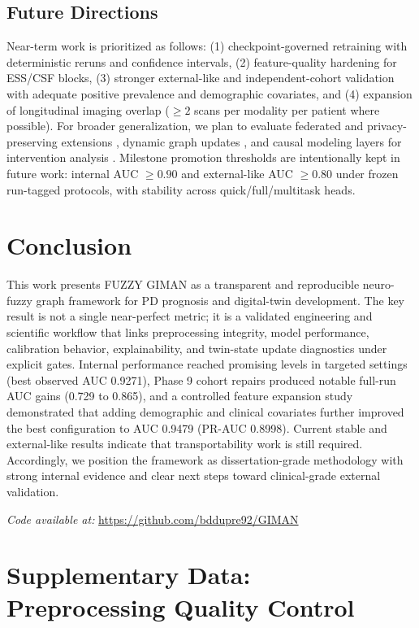 \documentclass[journal,twoside,web]{ieeecolor}
\begin{document}
\subsection{Future Directions}
Near-term work is prioritized as follows: (1) checkpoint-governed retraining with deterministic reruns and confidence intervals, (2) feature-quality hardening for ESS/CSF blocks, (3) stronger external-like and independent-cohort validation with adequate positive prevalence and demographic covariates, and (4) expansion of longitudinal imaging overlap (\(\geq 2\) scans per modality per patient where possible). For broader generalization, we plan to evaluate federated and privacy-preserving extensions \cite{kairouz2019advances}, dynamic graph updates \cite{kazemi2020representation}, and causal modeling layers for intervention analysis \cite{peters2017elements}. Milestone promotion thresholds are intentionally kept in future work: internal AUC \(\geq 0.90\) and external-like AUC \(\geq 0.80\) under frozen run-tagged protocols, with stability across quick/full/multitask heads.

\section{Conclusion}
This work presents FUZZY GIMAN as a transparent and reproducible neuro-fuzzy graph framework for PD prognosis and digital-twin development. The key result is not a single near-perfect metric; it is a validated engineering and scientific workflow that links preprocessing integrity, model performance, calibration behavior, explainability, and twin-state update diagnostics under explicit gates. Internal performance reached promising levels in targeted settings (best observed AUC 0.9271), Phase 9 cohort repairs produced notable full-run AUC gains (0.729 to 0.865), and a controlled feature expansion study demonstrated that adding demographic and clinical covariates further improved the best configuration to AUC 0.9479 (PR-AUC 0.8998). Current stable and external-like results indicate that transportability work is still required. Accordingly, we position the framework as dissertation-grade methodology with strong internal evidence and clear next steps toward clinical-grade external validation.

\textit{Code available at:} \url{https://github.com/bddupre92/GIMAN}


\appendices

\section{Supplementary Data: Preprocessing Quality Control}
\end{document}
